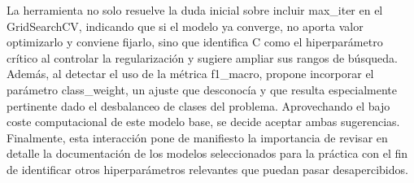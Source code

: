 \documentclass[12pt,a4paper,oneside]{book}
\begin{document}
\begin{iaanalisis}
La herramienta no solo resuelve la duda inicial sobre incluir max\_iter en el GridSearchCV, indicando que si el modelo ya converge, no aporta valor optimizarlo y conviene fijarlo, sino que identifica C como el hiperparámetro crítico al controlar la regularización y sugiere ampliar sus rangos de búsqueda. Además, al detectar el uso de la métrica f1\_macro, propone incorporar el parámetro class\_weight, un ajuste que desconocía y que resulta especialmente pertinente dado el desbalanceo de clases del problema. Aprovechando el bajo coste computacional de este modelo base, se decide aceptar ambas sugerencias. Finalmente, esta interacción pone de manifiesto la importancia de revisar en detalle la documentación de los modelos seleccionados para la práctica con el fin de identificar otros hiperparámetros relevantes que puedan pasar desapercibidos.
\end{iaanalisis}
\end{document}
